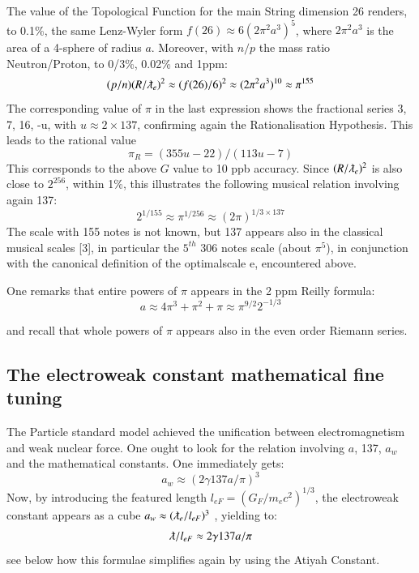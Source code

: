 \documentclass[twoside,draft]{article}
\begin{document}
\begin{sloppypar}
{The value of the Topological Function for the main String
 dimension 26 renders, to 0.1\%, the same Lenz-Wyler form $f(26) \approx 6(2\pi^{2} a^{3} )^{5}$, where $2\pi^{2}a^{3}$ is the area of a 4-sphere of radius $a$. Moreover, with $n/p$ the mass ratio Neutron/Proton, to 0/3\%, 0.02\% and 1ppm:
$$(p/n) (R/\lambdabar_{e})^{2} \approx (f(26)/6)^{2} \approx (2\pi^{2} a^{3})^{10} \approx \pi^{155}$$
The corresponding value of $\pi$ in the last expression shows the fractional series 3, 7, 16, -u, with $u \approx
2 \times 137$, confirming again the Rationalisation Hypothesis. This leads to the rational value
\begin{equation}
\pi_{R} = (355u-22)/(113u-7) 
\end{equation}
This corresponds to the above $G$ value to 10 ppb accuracy.
Since $(R/\lambdabar_{e})^{2}$ is also close to $2^{256}$, within 1\%, this illustrates the following musical relation involving again 137:
$$2^{1/155} \approx \pi^{1/256} \approx (2\pi)^{1/3 \times 137}$$
The scale with 155 notes is not known, but 137 appears also in the classical musical scales [3], in
particular the $5^{th}$ 306 notes scale (about $\pi^{5}$), in conjunction with the canonical definition of the optimalscale e, encountered above.

One remarks that entire powers of $\pi$ appears in the 2 ppm Reilly formula: 
\begin{equation}
a \approx 4\pi^{3} + \pi^{2} + \pi \approx \pi^{9/2}2^{-1/3}
\end{equation}

and recall that whole powers of $\pi$ appears also in the even order Riemann series.

\subsection {The electroweak constant mathematical fine tuning}

The Particle standard model achieved the unification between electromagnetism and weak
nuclear force. One ought to look for the relation involving $a$, 137, $a_{w}$ and the mathematical constants. One
immediately gets:
\begin{equation}
a_{w} \approx (2\gamma 137 a/\pi)^{3}
\end{equation}
Now, by introducing the featured length $l_{eF} = (G_{F}/m_{e} c^{2})^{1/3}$, the electroweak constant appears as
a cube $a_{w} \approx (\lambdabar_{e}/l_{eF})^{3}$ , yielding to:
\begin{equation}
\lambdabar/l_{eF} \approx 2\gamma 137 a/\pi
\end{equation}
see below how this formulae simplifies again by using the Atiyah Constant.

}
\end{sloppypar}
\end{document}
